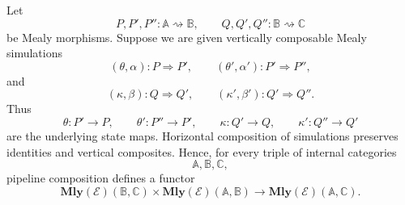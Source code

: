 \begin{proposition}
\label{prop:mealy-horizontal-composition-functorial}
    Let
    \[
        P,P',P'':\mathbb A\rightsquigarrow\mathbb B,
        \qquad
        Q,Q',Q'':\mathbb B\rightsquigarrow\mathbb C
    \]
    be Mealy morphisms. Suppose we are given vertically composable Mealy simulations
    \[
        (\theta,\alpha):P\Rightarrow P',
        \qquad
        (\theta',\alpha'):P'\Rightarrow P'',
    \]
    and
    \[
        (\kappa,\beta):Q\Rightarrow Q',
        \qquad
        (\kappa',\beta'):Q'\Rightarrow Q''.
    \]
    Thus
    \[
        \theta:P'\to P,
        \qquad
        \theta':P''\to P',
        \qquad
        \kappa:Q'\to Q,
        \qquad
        \kappa':Q''\to Q'
    \]
    are the underlying state maps. Horizontal composition of simulations preserves identities and vertical composites. Hence, for every triple of internal categories
    \[
        \mathbb A,\mathbb B,\mathbb C,
    \]
    pipeline composition defines a functor
    \[
        \mathbf{Mly}(\mathcal E)(\mathbb B,\mathbb C)
        \times
        \mathbf{Mly}(\mathcal E)(\mathbb A,\mathbb B)
        \longrightarrow
        \mathbf{Mly}(\mathcal E)(\mathbb A,\mathbb C).
    \]
\end{proposition}
